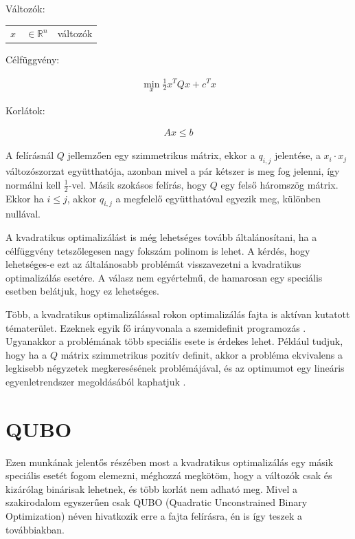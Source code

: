 Változók:

\begin{tabular}{lll}
	$x$ & $\in \mathbb{R}^n$ & változók \\
\end{tabular}

Célfüggvény:

\begin{align}
	\min_{x} \frac{1}{2} x^T Q x + c^T x 
\end{align}

Korlátok:

\begin{align}
	Ax \leq b
\end{align}

A felírásnál $Q$ jellemzően egy szimmetrikus mátrix, ekkor a $q_{i,j}$ jelentése, a $x_i \cdot x_j$ változószorzat együtthatója, azonban mivel a pár kétszer is meg fog jelenni, így normálni kell $\frac{1}{2}$-vel. Másik szokásos felírás, hogy $Q$ egy felső háromszög mátrix. Ekkor ha $i \leq j$, akkor $q_{i,j}$ a megfelelő együtthatóval egyezik meg, különben nullával.

A kvadratikus optimalizálást is még lehetséges tovább általánosítani, ha a célfüggvény tetszőlegesen nagy fokszám polinom is lehet. A kérdés, hogy lehetséges-e ezt az általánosabb problémát visszavezetni a kvadratikus optimalizálás esetére. A válasz nem egyértelmű, de hamarosan egy speciális esetben belátjuk, hogy ez lehetséges.

Több, a kvadratikus optimalizálással rokon optimalizálás fajta is aktívan kutatott tématerület. Ezeknek egyik fő irányvonala a szemidefinit programozás \cite{Ramana1996}. Ugyanakkor a problémának több speciális esete is érdekes lehet. Például tudjuk, hogy ha a $Q$ mátrix szimmetrikus pozitív definit, akkor a probléma ekvivalens a legkisebb négyzetek megkeresésének problémájával, és az optimumot egy lineáris egyenletrendszer megoldásából kaphatjuk \cite{rozsa}.

\section{QUBO}\label{sec:QUBO}

Ezen munkának jelentős részében most a kvadratikus optimalizálás egy másik speciális esetét fogom elemezni, méghozzá megkötöm, hogy a változók csak és kizárólag binárisak lehetnek, és több korlát nem adható meg. Mivel a szakirodalom egyszerűen csak QUBO (Quadratic Unconstrained Binary Optimization) néven hivatkozik erre a fajta felírásra\cite{enwiki:1020700695}\cite{DWaveOceanBQM}, én is így teszek a továbbiakban.

